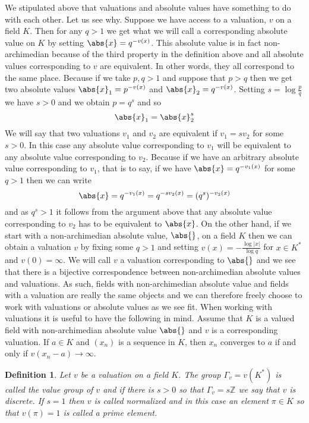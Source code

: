 \documentclass{article}
\newtheorem{definition}{Definition}[section]
\newcommand{\mbb}[1]{\mathbb{#1}}
\numberwithin{equation}{section}
\begin{document}
We stipulated above that valuations and absolute values have something to do with each other. Let us see why. Suppose we have access to a valuation, $v$ on a field $K$. Then for any $q > 1$ we get what we will call a corresponding absolute value on $K$ by setting $\abs{x} = q^{-v(x)}$. This absolute value is in fact non-archimedian because of the third property in the definition above and all absolute values corresponding to $v$ are equivalent. In other words, they all correspond to the same place. Because if we take $p,q > 1$ and suppose that $p > q$ then we get two absolute values $\abs{x}_1 = p^{-v(x)}$ and $\abs{x}_2 = q^{-v(x)}$. Setting $s = \log \frac{p}{q}$ we have $s > 0$ and we obtain $p = q^s$ and so
$$\abs{x}_1 = \abs{x}_2^s$$
We will say that two valuations $v_1$ and $v_2$ are equivalent if $v_1 = sv_2$ for some $s > 0$. In this case any absolute value corresponding to $v_1$ will be equivalent to any absolute value corresponding to $v_2$. Because if we have an arbitrary absolute value corresponding to $v_1$, that is to say, if we have $\abs{x} = q^{-v_1(x)}$ for some $q > 1$ then we can write
$$\abs{x} = q^{-v_1(x)} = q^{-sv_2(x)} = (q^s)^{-v_2(x)}$$
and as $q^s > 1$ it follows from the argument above that any absolute value corresponding to $v_2$ has to be equivalent to $\abs{x}$. On the other hand, if we start with a non-archimedian absolute value, $\abs{}$, on a field $K$ then we can obtain a valuation $v$ by fixing some $q > 1$ and setting $v(x) = -\frac{\log |x|}{\log q}$ for $x \in K^*$ and $v(0) = \infty$. We will call $v$ a valuation corresponding to $\abs{}$ and we see that there is a bijective correspondence between non-archimedian absolute values and valuations. As such, fields with non-archimedian absolute value and fields with a valuation are really the same objects and we can therefore freely choose to work with valuations or absolute values as we see fit. When working with valuations it is useful to have the following in mind. Assume that $K$ is a valued field with non-archimedian absolute value $\abs{}$ and $v$ is a corresponding valuation. If $a \in K$ and $(x_n)$ is a sequence in $K$, then $x_n$ converges to $a$ if and only if $v(x_n - a) \to \infty$.


\begin{definition}
    Let $v$ be a valuation on a field $K$. The group $\Gamma_v = v(K^*)$ is called the value group of $v$ and if there is $s > 0$ so that $\Gamma_v = s\mbb Z$ we say that $v$ is discrete. If $s = 1$ then $v$ is called normalized and in this case an element $\pi \in K$ so that $v(\pi) = 1$ is called a prime element.
   
\end{definition}
\end{document}
